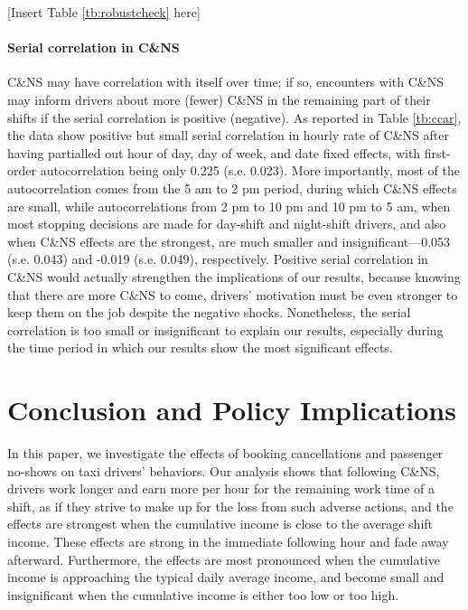 \documentclass[reviewmode,AEJ]{AEA}
\begin{document}
\begin{center}
	[Insert Table \ref{tb:robustcheck} here]
\end{center}

\paragraph{Serial correlation in C\&NS} C\&NS may have correlation with itself over time; if so, encounters
with C\&NS may inform drivers about more (fewer) C\&NS in the remaining part of their shifts if the serial 
correlation is positive (negative). As reported in Table \ref{tb:ccar}, the data show positive but small 
serial correlation in hourly rate of C\&NS after having partialled out hour of day, day of week, and date 
fixed effects, with first-order autocorrelation being only 0.225 (s.e. 0.023). More importantly, most of 
the autocorrelation comes from the 5 am to 2 pm period, during which C\&NS effects are small, while 
autocorrelations from 2 pm to 10 pm and 10 pm to 5 am, when most stopping decisions are made for day-shift
and night-shift drivers, and also when C\&NS effects are the strongest, are much smaller and insignificant---0.053
(s.e. 0.043) and -0.019 (s.e. 0.049), respectively. Positive serial correlation in C\&NS would actually strengthen
the implications of our results, because knowing that there are more C\&NS to come, drivers' motivation must 
be even stronger to keep them on the job despite the negative shocks. Nonetheless, the serial correlation is
too small or insignificant to explain our results, especially during the time period in which our results 
show the most significant effects.

\section{Conclusion and Policy Implications}
\label{sec:conclude}
In this paper, we investigate the effects of booking cancellations and passenger no-shows on taxi 
drivers' behaviors. Our analysis shows that following C\&NS, drivers work longer and earn more per hour
for the remaining work time of a shift, as if they strive to make up for the loss from such adverse actions, and the effects are strongest when the cumulative income is close to the average shift income. 
These effects are strong in the immediate following hour and fade away afterward. Furthermore, the effects are most pronounced when the cumulative income is approaching the typical daily average income, and become small and insignificant when the cumulative income is either too low or too high.
\end{document}
